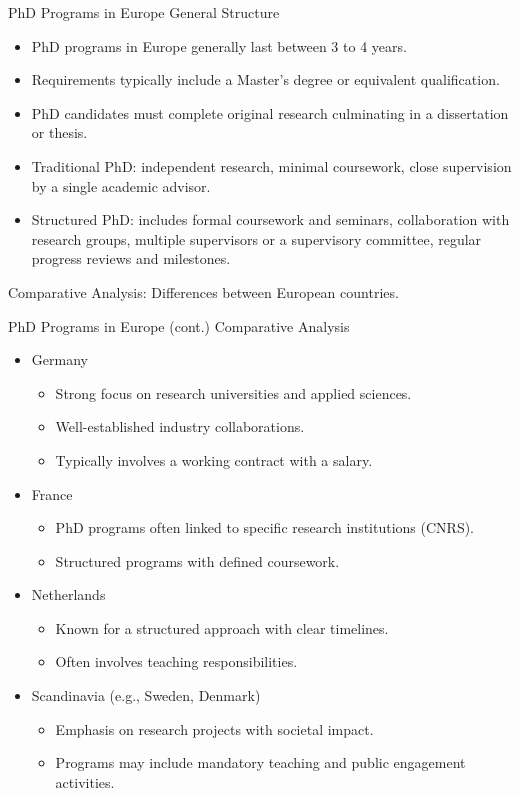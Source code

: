 \documentclass[10pt]{beamer}
\begin{document}
\begin{frame}[fragile]{PhD Programs in Europe}
\alert{General Structure}
\begin{itemize}
	\item PhD programs in Europe generally last between 3 to 4 years.
	\item Requirements typically include a Master’s degree or equivalent qualification.
	\item PhD candidates must complete original research culminating in a dissertation or thesis.
	\item Traditional PhD: independent research, minimal coursework, close supervision by a single academic advisor.
	\item Structured PhD: includes formal coursework and seminars, collaboration with research groups, multiple supervisors or a supervisory committee, regular progress reviews and milestones.
\end{itemize}
Comparative Analysis:
Differences between European countries.

\end{frame}

\begin{frame}[fragile]{PhD Programs in Europe (cont.)}
\alert{Comparative Analysis}
\begin{itemize}
	\item Germany
	\begin{itemize}
		\item Strong focus on research universities and applied sciences.
		\item Well-established industry collaborations.
		\item Typically involves a working contract with a salary.
	\end{itemize}
	\item France
	\begin{itemize}
		\item PhD programs often linked to specific research institutions (CNRS).
		\item Structured programs with defined coursework.
	\end{itemize}
	\item Netherlands
	\begin{itemize}
		\item Known for a structured approach with clear timelines.
		\item Often involves teaching responsibilities.
	\end{itemize}
	\item Scandinavia (e.g., Sweden, Denmark)
	\begin{itemize}
		\item Emphasis on research projects with societal impact.
		\item Programs may include mandatory teaching and public engagement activities.
	\end{itemize}
\end{itemize}

\end{frame}
\end{document}
